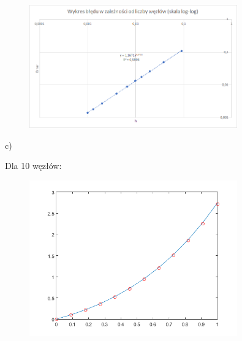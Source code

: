 \begin{samepage}
	
	\begin{figure}[!ht]
		\begin{center}
			\includegraphics[width=0.8\textwidth]{Lab4/charts/zad4/2/error.png}
		\end{center}
	\end{figure}
	\FloatBarrier
\end{samepage} 

\newpage

c)\\
\begin{samepage}
	Dla 10 węzłów:
	
	
	
	\FloatBarrier
	\begin{figure}[!ht]
		\begin{center}
			\includegraphics[width=0.8\textwidth]{Lab4/charts/zad4/3/10.png}
		\end{center}
	\end{figure}
	\FloatBarrier
\end{samepage}

